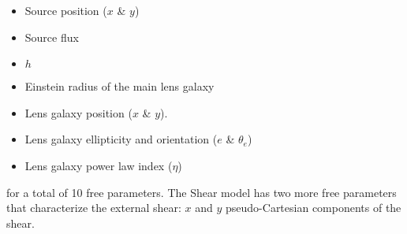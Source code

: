\begin{itemize}
\item Source position ($x$ \& $y$)
\item Source flux
\item $h$
\item Einstein radius of the main lens galaxy
\item Lens galaxy position ($x$ \& $y$).
\item Lens galaxy ellipticity and orientation ($e$ \& $\theta_e$)
\item Lens galaxy power law index ($\eta$)
\end{itemize}
for a total of 10 free parameters.
The Shear model has two more free parameters that characterize the external shear: $x$ and $y$ pseudo-Cartesian components of the shear.
